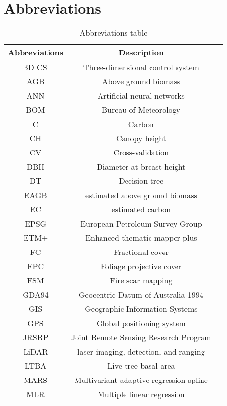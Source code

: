 \newpage

\section*{Abbreviations}
\begin{table}[h!]

\caption{Abbreviations table}
\label{table:abreviation}
\centering
\begin{tabular*}{\textwidth}{c @{\extracolsep{\fill}} c c}

 \hline
 Abbreviations & Description \\ [0.5ex] 
 \hline
  3D CS & Three-dimensional control system \\
  AGB & Above ground biomass \\
  ANN & Artificial neural networks \\
  BOM & Bureau of Meteorology \\
  C & Carbon \\
  CH & Canopy height \\
  CV & Cross-validation \\
  DBH & Diameter at breast height \\
  DT & Decision tree \\
  EAGB & estimated above ground biomass \\
  EC & estimated carbon \\
  EPSG & European Petroleum Survey Group \\
  ETM+ &  Enhanced thematic mapper plus\\
  FC & Fractional cover \\
  FPC & Foliage projective cover \\
  FSM & Fire scar mapping \\
  GDA94 & Geocentric Datum of Australia 1994 \\
  GIS & Geographic Information Systems \\
  GPS & Global positioning system \\
  JRSRP & Joint Remote Sensing Research Program \\ 
  LiDAR & laser imaging, detection, and ranging \\
  LTBA & Live tree basal area \\
  MARS & Multivariant adaptive regression spline \\
  MLR & Multiple linear regression \\

\end{tabular*}
\end{table}
